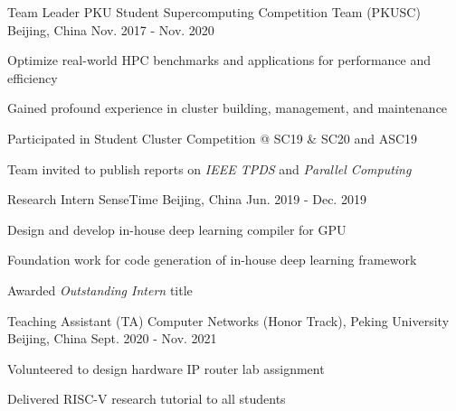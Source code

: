 \begin{cventries}
  \cventry
    {Team Leader} %
    {PKU Student Supercomputing Competition Team (PKUSC)} %
    {Beijing, China} %
    {Nov. 2017 - Nov. 2020} %
    {
      \begin{cvitems} %
        \item {Optimize real-world HPC benchmarks and applications for performance and efficiency}
        \item {Gained profound experience in cluster building, management, and maintenance}
        \item {Participated in Student Cluster Competition @ SC19 \& SC20 and ASC19}
        \item {Team invited to publish reports on \textit{IEEE TPDS} and \textit{Parallel Computing}}
      \end{cvitems}
    }

\end{cventries}


\begin{cventries}
    \cventry
    {Research Intern}
    {SenseTime}
    {Beijing, China}
    {Jun. 2019 - Dec. 2019}
    {
        \begin{cvitems}
        \item {Design and develop in-house deep learning compiler for GPU}
        \item {Foundation work for code generation of in-house deep learning framework}
        \item {Awarded \textit{Outstanding Intern} title}
        \end{cvitems}
    }
\end{cventries}


\begin{cventries}
    \cventry
    {Teaching Assistant (TA)}
    {Computer Networks (Honor Track), Peking University}
    {Beijing, China}
    {Sept. 2020 - Nov. 2021}
    {
        \begin{cvitems}
        \item {Volunteered to design hardware IP router lab assignment}
        \item {Delivered RISC-V research tutorial to all students}
        \end{cvitems}
    }
\end{cventries}
